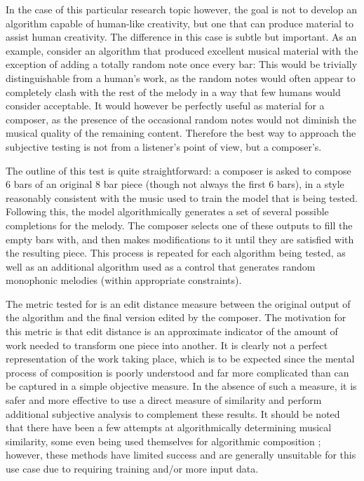 \documentclass[ author={Stephen Livermore-Tozer},
				supervisor={Dr. Peter Flach},
				degree={MEng},
				title={Algorithmic Co-composition Using Machine Learning},
				subtitle={},
				type={research},
				year={2016} ]{dissertation}
\begin{document}
	In the case of this particular research topic however, the goal is not to develop an algorithm capable of human-like creativity, but one that can produce material to assist human creativity. The difference in this case is subtle but important. As an example, consider an algorithm that produced excellent musical material with the exception of adding a totally random note once every bar: This would be trivially distinguishable from a human's work, as the random notes would often appear to completely clash with the rest of the melody in a way that few humans would consider acceptable. It would however be perfectly useful as material for a composer, as the presence of the occasional random notes would not diminish the musical quality of the remaining content. Therefore the best way to approach the subjective testing is not from a listener's point of view, but a composer's.
	
	The outline of this test is quite straightforward: a composer is asked to compose 6 bars of an original 8 bar piece (though not always the first 6 bars), in a style reasonably consistent with the music used to train the model that is being tested. Following this, the model algorithmically generates a set of several possible completions for the melody. The composer selects one of these outputs to fill the empty bars with, and then makes modifications to it until they are satisfied with the resulting piece. This process is repeated for each algorithm being tested, as well as an additional algorithm used as a control that generates random monophonic melodies (within appropriate constraints).
	
	The metric tested for is an edit distance measure between the original output of the algorithm and the final version edited by the composer. The motivation for this metric is that edit distance is an approximate indicator of the amount of work needed to transform one piece into another. It is clearly not a perfect representation of the work taking place, which is to be expected since the mental process of composition is poorly understood and far more complicated than can be captured in a simple objective measure. In the absence of such a measure, it is safer and more effective to use a direct measure of similarity and perform additional subjective analysis to complement these results. It should be noted that there have been a few attempts at algorithmically determining musical similarity, some even being used themselves for algorithmic composition \cite{burton1998hybrid}; however, these methods have limited success and are generally unsuitable for this use case due to requiring training and/or more input data.
	
\end{document}
